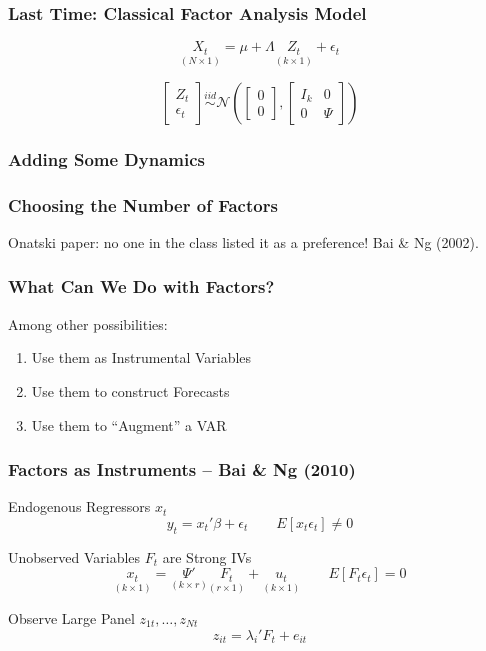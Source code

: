 \documentclass[handout]{beamer}
\begin{document}
\begin{frame}[c]\frametitle{Last Time: Classical Factor Analysis Model}
    
$$\underset{(N\times 1)}{X_t} = \mu + \Lambda \underset{(k\times 1)}{Z_t} + \epsilon_t$$

\vspace{2em}

\small

$$
\left[ \begin{array}
	{c} Z_t \\ \epsilon_t
\end{array}\right]
\overset{iid}{\sim} \mathcal{N}\left(
\left[ \begin{array}
	{c} 0\\ 0 
\end{array}\right],
\left[ \begin{array}
	{cc} I_k & 0\\
	0 & \Psi
\end{array}\right]\right)$$
\end{frame}
\begin{frame}
	\frametitle{Adding Some Dynamics}
\end{frame}

\begin{frame}
	\frametitle{Choosing the Number of Factors}
	Onatski paper: no one in the class listed it as a preference! Bai \& Ng (2002).
\end{frame}

\begin{frame}
\frametitle{What Can We Do with Factors?}

Among other possibilities:
\begin{enumerate}
	\item Use them as Instrumental Variables 
	\item Use them to construct Forecasts
	\item Use them to ``Augment'' a VAR
\end{enumerate}

\end{frame}

\begin{frame}[c]\frametitle{Factors as Instruments -- Bai \& Ng (2010)}
\begin{block}
   	{Endogenous Regressors $x_t$}
$$y_t = x_t' \beta + \epsilon_t \quad \quad E[x_t\epsilon_t] \neq 0 $$
\end{block}   

 \begin{block}
 	{Unobserved Variables $F_t$ are Strong IVs}
$$\underset{(k\times 1)}{x_t} = \underset{(k\times r)}{\Psi'}\underset{(r\times 1)}{F_t} + \underset{(k\times 1)}{u_t} \quad \quad E[F_t \epsilon_t] = 0$$
 \end{block}

\begin{block}
	{Observe Large Panel $z_{1t}, \hdots, z_{Nt}$}
		$$z_{it} = \lambda_i' F_t + e_{it}$$
\end{block}

\end{frame}
\end{document}
